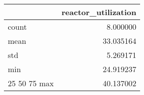 \begin{tabular}{lr}
\toprule
 & reactor\_utilization \\
\midrule
count & 8.000000 \\
mean & 33.035164 \\
std & 5.269171 \\
min & 24.919237 \\
25%
50%
75%
max & 40.137002 \\
\bottomrule
\end{tabular}

